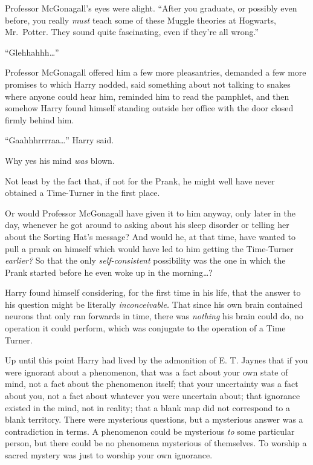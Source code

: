 Professor McGonagall's eyes were alight. ``After you graduate, or
possibly even before, you really \emph{must} teach some of these Muggle
theories at Hogwarts, Mr.~Potter. They sound quite fascinating, even if
they're all wrong.''

``Glehhahhh\ldots{}''

Professor McGonagall offered him a few more pleasantries, demanded a few
more promises to which Harry nodded, said something about not talking to
snakes where anyone could hear him, reminded him to read the pamphlet,
and then somehow Harry found himself standing outside her office with
the door closed firmly behind him.

``Gaahhhrrrraa\ldots{}'' Harry said.

Why yes his mind \emph{was} blown.

Not least by the fact that, if not for the Prank, he might well have
never obtained a Time-Turner in the first place.

Or would Professor McGonagall have given it to him anyway, only later in
the day, whenever he got around to asking about his sleep disorder or
telling her about the Sorting Hat's message? And would he, at that time,
have wanted to pull a prank on himself which would have led to him
getting the Time-Turner \emph{earlier?} So that the only
\emph{self-consistent} possibility was the one in which the Prank
started before he even woke up in the morning\ldots{}?

Harry found himself considering, for the first time in his life, that
the answer to his question might be literally \emph{inconceivable.} That
since his own brain contained neurons that only ran forwards in time,
there was \emph{nothing} his brain could do, no operation it could
perform, which was conjugate to the operation of a Time Turner.

Up until this point Harry had lived by the admonition of E. T. Jaynes
that if you were ignorant about a phenomenon, that was a fact about your
own state of mind, not a fact about the phenomenon itself; that your
uncertainty was a fact about you, not a fact about whatever you were
uncertain about; that ignorance existed in the mind, not in reality;
that a blank map did not correspond to a blank territory. There were
mysterious questions, but a mysterious answer was a contradiction in
terms. A phenomenon could be mysterious \emph{to} some particular
person, but there could be no phenomena mysterious of themselves. To
worship a sacred mystery was just to worship your own ignorance.

